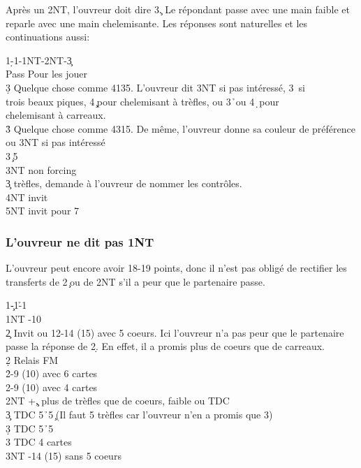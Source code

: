 \documentclass[a4paper]{article}
\begin{document}
Après un 2NT, l'ouvreur doit dire 3\c . Le répondant passe avec une main faible
et reparle avec une main chelemisante. Les réponses sont naturelles et les
continuations aussi:

\begin{bidtable}
1\d-1\s-1NT-2NT-3\c\+\\
Pass \> Pour les jouer\\
3\d \> Quelque chose comme 4135. L'ouvreur dit 3NT si pas intéressé, 3\s\ si\\
\>trois beaux piques, 4\c\ pour chelemisant à trèfles, ou 3\h\ ou 4\d\ pour\\
\>chelemisant à carreaux.\\
3\h \> Quelque chose comme 4315. De même, l'ouvreur donne sa couleur de préférence\\
\>ou 3NT si pas intéressé\\
3\s {}\c\ 5\s \\
3NT  non forcing\\
3\c {} trèfles, demande à l'ouvreur de nommer les contrôles.\\
4NT  invit\\
5NT  invit pour 7\-
\end{bidtable}

\subsubsection{L'ouvreur ne dit pas 1NT}

L'ouvreur peut encore avoir 18-19 points, donc il n'est pas obligé de rectifier
les transferts de 2\c\ ou de 2NT s'il a peur que le partenaire passe.

\begin{bidtable}
1\c-1\h-1\s\+\\
1NT -10\\
2\c \> Invit ou 12-14 (15) avec 5 coeurs. Ici l'ouvreur n'a pas peur que le partenaire\\
\>passe la réponse de 2\d . En effet, il a promis plus de coeurs que de carreaux.\\
2\d \> Relais FM\\
2\h {}-9 (10) avec 6 cartes\\
2\s {}-9 (10) avec 4 cartes\\
2NT +\c , plus de trèfles que de coeurs, faible ou TDC\\
3\c \> TDC 5\h\ 5\c\ (Il faut 5 trèfles car l'ouvreur n'en a promis que 3)\\
3\d \> TDC 5\h\ 5\d \\
3\s \> TDC 4 cartes\\
3NT -14 (15) sans 5 coeurs\-
\end{bidtable}
\end{document}
